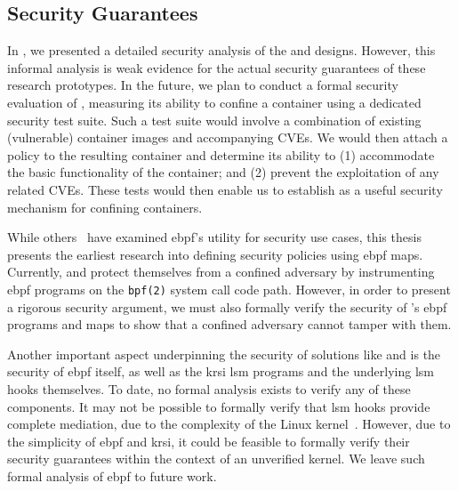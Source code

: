 \subsection{Security Guarantees}%
\label{ss:disc-guarantees}

In , we presented a detailed security analysis of the \bpfbox{} and
\bpfcontain{} designs.  However, this informal analysis is weak evidence for the actual
security guarantees of these research prototypes.  In the future, we plan to conduct
a formal security evaluation of \bpfcontain{}, measuring its ability to confine
a container using a dedicated security test suite. Such a test suite would involve
a combination of existing (vulnerable) container images and accompanying CVEs. We would
then attach a \bpfcontain{} policy to the resulting container and determine its ability to
(1) accommodate the basic functionality of the container; and (2) prevent the exploitation
of any related CVEs. These tests would then enable us to establish \bpfcontain{}
as a useful security mechanism for confining containers.

While others~\cite{tracee, cilium} have examined \gls{ebpf}'s utility for security use
cases, this thesis presents the earliest research into defining security policies using
\gls{ebpf} maps. Currently, \bpfbox{} and \bpfcontain{} protect themselves from a confined
adversary by instrumenting \gls{ebpf} programs on the \texttt{bpf(2)} system call code
path. However, in order to present a rigorous security argument, we must also formally
verify the security of \bpfcontain{}'s \gls{ebpf} programs and maps to show that
a confined adversary cannot tamper with them.

Another important aspect underpinning the security of solutions like \bpfbox{} and
\bpfcontain{} is the security of \gls{ebpf} itself, as well as the \gls{krsi} \gls{lsm}
programs and the underlying \gls{lsm} hooks themselves. To date, no formal analysis exists
to verify any of these components. It may not be possible to formally verify that
\gls{lsm} hooks provide complete mediation, due to the complexity of the Linux
kernel~\cite{jaeger2008_os_security}. However, due to the simplicity of \gls{ebpf} and
\gls{krsi}, it could be feasible to formally verify their security guarantees within the
context of an unverified kernel. We leave such formal analysis of \gls{ebpf} to future
work.




